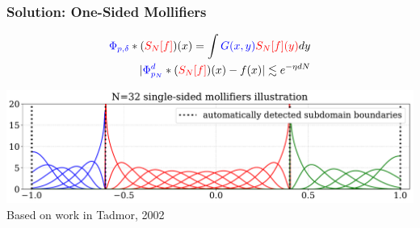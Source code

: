 \documentclass[9pt,usepdftitle=false,aspectratio=169]{beamer}
\begin{document}
\begin{frame}
  \frametitle{Solution: One-Sided {\color{blue}Mollifiers}}
  \begin{large}
  \begin{eqnarray}
    {\color{blue}\Phi_{p,\delta}}*({\color{red}S_N[f]})(x) = \int {\color{blue}G(x,y)} {\color{red}S_N[f](y)}dy\nonumber\\
    \lvert {\color{blue}\Phi^d_{p_N}}*({\color{red}S_N[f]})(x) - f(x) \rvert \lesssim e ^{- \eta d N}\nonumber
  \end{eqnarray}
  \end{large}
  \begin{center}
    \includegraphics[width=\textwidth]{mollifiers}\\
    {\small Based on work in Tadmor, 2002}
  \end{center}
\end{frame}
\end{document}
